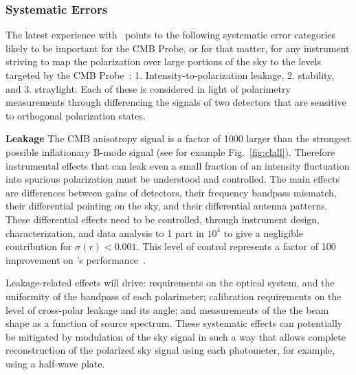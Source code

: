 
\subsubsection{Systematic Errors}
\vspace{-0.05in}

The latest experience with \planck\ points to the following systematic error categories likely to be important for 
the CMB Probe, or for that matter, for any instrument striving to map the polarization 
over large portions of the sky to the levels targeted by the CMB Probe~\cite{PlanckintermediateXLVI}:
1. Intensity-to-polarization leakage, 2. stability, and 3. straylight. 
Each of these is considered in light of polarimetry measurements through
differencing the signals of two detectors that are sensitive to orthogonal polarization states. 

\textbf{Leakage} \hspace{0.1in} The CMB anisotropy signal is a factor of 1000 larger 
than the strongest possible inflationary B-mode signal (see for example Fig.~\ref{fig:clall}). 
Therefore instrumental effects that can leak
even a small fraction of an intensity fluctuation into spurious  polarization
must be understood and controlled. The main effects are differences between gains of detectors, 
their frequency bandpass mismatch, their differential pointing on the sky, 
and their differential antenna patterns. These differential effects need to be controlled, through 
instrument design, characterization, and data analysis to 1 part in $10^{4}$ to give a negligible contribution for 
$\sigma(r) <0.001$.  This level of control represents a factor of 100 improvement on \planck 's performance~\cite{PlanckintermediateXLVI}. 

Leakage-related effects will drive: requirements on the optical system, and the uniformity of the
bandpass of each polarimeter;  calibration requirements on the level of cross-polar leakage and its angle; 
and measurements of the the beam shape as a function of source spectrum. 
These systematic effects can potentially be mitigated by modulation of the sky signal in
such a way that allows complete reconstruction of the 
polarized sky signal using each photometer, for example, using a
half-wave plate.  

